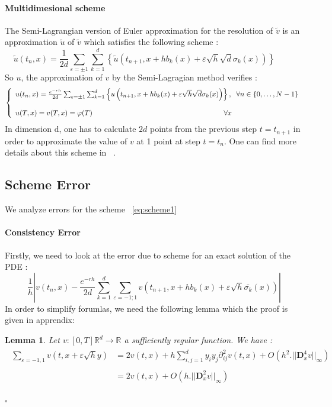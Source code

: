 \documentclass[a4paper,10pt]{article}
\newtheorem{lemma}{Lemma}
\begin{document}
\paragraph{Multidimesional scheme}
The Semi-Lagrangian version of Euler approximation for the resolution of $\tilde{v}$ is an approximation $\tilde{u}$ of $\tilde{v}$ which satisfies the following scheme :
\begin{equation}
\tilde{u}(t_{n},x)= \frac{1}{2d} \sum_{\varepsilon = \pm1} \sum_{k=1}^d 
\left\{
\tilde{u}\left(
				t_{n+1},x + hb_k(x) + \varepsilon \sqrt{h} \sqrt{d}  \sigma_k (x) 				\right)
\right\}
\hspace{1cm}
\end{equation} 
So $u$, the approximation of $v$ by the Semi-Lagragian method verifies :
\begin{equation}\label{eq:scheme1}
\left\lbrace
\begin{array}{l}
u(t_{n},x)= \frac{e^{-rh}}{2d} \sum_{\varepsilon = \pm1} \sum_{k=1}^d 
\left\{
u\left(
				t_{n+1},x + hb_k(x) + \varepsilon \sqrt{h} \sqrt{d}  \sigma_k (x) 				\right)
\right\}, \hspace{0.2cm} \forall n \in \{0,\dots,N-1\} \\ \\
u(T,x) = v(T,x)= \varphi(T) \hspace{6.5cm} \forall x
\end{array}
\right.
\end{equation}
In dimension d,  one has to calculate $2d$ points from the previous step $t=t_{n+1}$ in order to approximate the value of $v$ at 1 point at step $t=t_n$. One can find more details about this scheme in ~\cite{Fabio}. 
\subsection{Scheme Error}
We analyze errors for the scheme  ~\eqref{eq:scheme1}
\paragraph{Consistency Error}
Firstly, we need to look at the error due to scheme for an exact solution of the PDE :
\[
\frac{1}{h} | v(t_n,x) -  \frac{e^{-rh}}{2d}  \sum_{k=1}^d \sum_{\varepsilon={-1;1}}
v(t_{n+1},x + hb_k(x) +\varepsilon \sqrt{h}  \bar{\sigma_k}(x) ) |
\]
In order to simplify forumlas, we need the following lemma which the proof is given in apprendix: 
\begin{lemma}
Let $v:[0,T]\mathbb{R}^d \longrightarrow \mathbb{R} $ a sufficiently regular function. We have : 
\begin{align*}
\begin{array}{ll}
\sum_{\varepsilon={-1,1}}v(t,x+\varepsilon\sqrt{h}y)
& = 2v(t,x) + h\sum_{i,j=1}^d y_{i}y_{j}\partial^2_{ij}v(t,x) + O(h^2.||\textbf{D}^4_xv||_\infty)\\\\
& = 2v(t,x) +  O(h.||\textbf{D}^2_xv||_\infty)
\end{array}
\end{align*}
\begin{flushright}
$\square$
\end{flushright}
\end{lemma}
\end{document}
